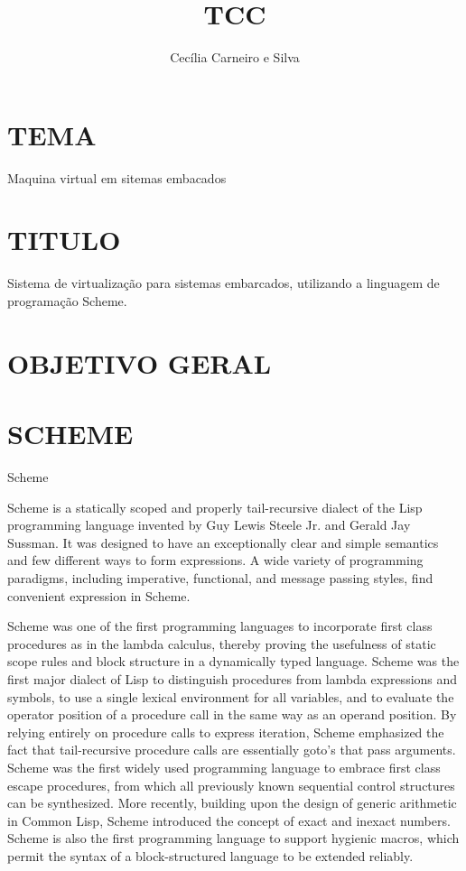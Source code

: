 \documentclass[11pt]{article}
\author{Cecília Carneiro e Silva}
\date{}
\title{TCC}
\begin{document}
\maketitle
\tableofcontents


\section{TEMA}
\label{sec-1}

Maquina virtual em sitemas embacados

\section{TITULO}
\label{sec-2}

Sistema de virtualização para sistemas embarcados, utilizando a linguagem de programação Scheme.

\section{OBJETIVO GERAL}
\label{sec-3}


\section{SCHEME}
\label{sec-4}

Scheme

Scheme is a statically scoped and properly tail-recursive dialect of the Lisp programming language invented by Guy Lewis Steele Jr. and Gerald Jay Sussman. It was designed to have an exceptionally clear and simple semantics and few different ways to form expressions. A wide variety of programming paradigms, including imperative, functional, and message passing styles, find convenient expression in Scheme.

Scheme was one of the first programming languages to incorporate first class procedures as in the lambda calculus, thereby proving the usefulness of static scope rules and block structure in a dynamically typed language. Scheme was the first major dialect of Lisp to distinguish procedures from lambda expressions and symbols, to use a single lexical environment for all variables, and to evaluate the operator position of a procedure call in the same way as an operand position. By relying entirely on procedure calls to express iteration, Scheme emphasized the fact that tail-recursive procedure calls are essentially goto's that pass arguments. Scheme was the first widely used programming language to embrace first class escape procedures, from which all previously known sequential control structures can be synthesized. More recently, building upon the design of generic arithmetic in Common Lisp, Scheme introduced the concept of exact and inexact numbers. Scheme is also the first programming language to support hygienic macros, which permit the syntax of a block-structured language to be extended reliably.
\end{document}
